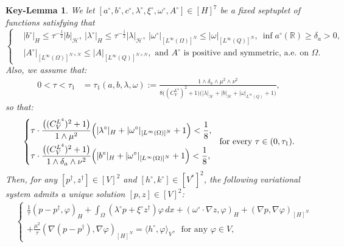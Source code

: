 \documentclass{sinst}
\numberwithin{equation}{section}
\theoremstyle{plain}
\newtheorem{keylem}{Key-Lemma}
\theoremstyle{definition}
\def\R{\mathbb{R}}
\def\sH{\mathscr{H}}
\begin{document}
\begin{keylem} \label{lem:P_TD}
  We let $[a^\circ,b^\circ,c^\circ,\lambda^\circ,\xi^\circ,\omega^\circ,A^\circ] \in [H]^7$ be a fixed septuplet of functions satisfying that 
  \begin{equation}
    \left\{ \begin{aligned}
      &|b^\circ|_H \leq \tau^{-\frac{1}{2}}|b|_\sH, \ |\lambda^\circ|_H \leq \tau^{-\frac{1}{2}}|\lambda|_\sH, \ |\omega^\circ|_{[L^\infty(\Omega)]^N} \leq |\omega|_{[L^\infty(Q)]^N}, \ \inf a^\circ(\R) \geq \delta_a > 0, 
      \\
      &|A^\circ|_{[L^\infty(\Omega)]^{N \times N}} \leq |A|_{[L^\infty(Q)]^{N \times N}}, \mbox{ and $A^\circ$ is positive and symmetric, a.e. on $\Omega$}. 
    \end{aligned} \right. \label{P_exist0}
  \end{equation}
  Also, we assume that:  
  \begin{align}
    0 < \tau < \tau_1 &= \tau_1(a,b,\lambda,\omega) := \frac{1 \wedge \delta_a \wedge \mu^2 \wedge \nu^2}{8 \bigl( (C_V^{L^4})^2 + 1 \bigr)\bigl( |\lambda|_\sH + |b|_\sH + |\omega|_{L^\infty(Q)} + 1\bigr)}, \label{P_exist1}
  \end{align}
  so that:
  \begin{equation}
    \left\{ \begin{aligned}
      &\tau \cdot \frac{\bigl( (C_V^{L^4})^2 + 1 \bigr)}{1 \wedge \mu^2} \Bigl( |\lambda^\circ|_H + |\omega^\circ|_{[L^\infty(\Omega)]^N} + 1 \Bigr) < \frac{1}{8},
      \\
      &\tau \cdot \frac{\bigl( (C_V^{L^4})^2 + 1 \bigr)}{1 \wedge \delta_a \wedge \nu^2} \Bigl( |b^\circ|_H + |\omega^\circ|_{[L^\infty(\Omega)]^N} + 1 \Bigr) < \frac{1}{8},
    \end{aligned} \right. \ \mbox{ for every } \tau \in (0,\tau_1). \label{P_exist2}
  \end{equation}
  Then, for any $[p^\dagger, z^\dagger] \in [V]^2$ and $[h^\circ, k^\circ] \in [V^*]^2$, the following variational system admits a unique solution $[p,z] \in [V]^2$:
  \begin{align}
    &\left\{ \begin{gathered}
      \frac{1}{\tau}(p - p^\dagger, \varphi)_H + \int_\Omega (\lambda^\circ p + \xi^\circ z^\dagger) \varphi \,dx + (\omega^\circ \cdot \nabla z, \varphi)_H + (\nabla p, \nabla \varphi)_{[H]^N} 
      \\
      + \frac{\mu^2}{\tau} (\nabla (p - p^\dagger), \nabla \varphi)_{[H]^N} = \langle h^\circ, \varphi \rangle_V, \ \mbox{ for any } \varphi \in V,

\end{gathered}
\end{align}
\end{keylem}
\end{document}
